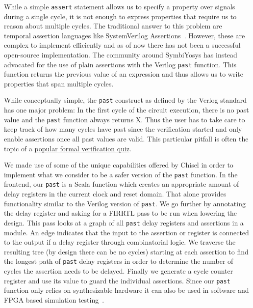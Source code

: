 \documentclass[conference]{IEEEtran}
\newcommand\scalainline[1]{\texttt{#1}}
\begin{document}
While a simple \scalainline{assert} statement allows us to specify a property over signals during a single
cycle, it is not enough to express properties that require us to reason about multiple cycles.
The traditional answer to this problem are temporal assertion languages like SystemVerilog Assertions~\cite{systemverilog}.
However, these are complex to implement efficiently and as of now there has not been a successful open-source implementation.
The community around SymbiYosys has instead advocated for the use of plain assertions with the Verilog \scalainline{past}
function. This function returns the previous value of an expression and thus allows us to write properties that span multiple cycles.

While conceptually simple, the \scalainline{past} construct as defined by the Verlog standard has one major problem:
In the first cycle of the circuit execution, there is no past value and the \scalainline{past} function always returns X.
Thus the user has to take care to keep track of how many cycles have past since the verification started and only enable assertions
once all past values are valid.
This particular pitfall is often the topic of a \href{http://zipcpu.com/quiz/2019/11/16/quiz07.html}{popular formal verification quiz}.

We made use of some of the unique capabilities offered by Chisel in order to implement what we consider to be a safer version of the
\scalainline{past} function.
In the frontend, our \scalainline{past} is a Scala function which creates an appropriate amount of delay registers in the current
clock and reset domain. That alone provides functionality similar to the Verilog version of \scalainline{past}.
We go further by annotating the delay register and asking for a FIRRTL pass to be run when lowering the design.
This pass looks at a graph of all \scalainline{past} delay registers and assertions in a module.
An edge indicates that the input to the assertion or register is connected to the output if a delay register through combinatorial logic.
We traverse the resulting tree (by design there can be no cycles) starting at each assertion
to find the longest path of \scalainline{past} delay registers in order to determine the number of cycles the assertion needs to be delayed.
Finally we generate a cycle counter register and use its value to guard the individual assertions.
Since our \scalainline{past} function only relies on synthesizable hardware it can also be used in software and FPGA based
simulation testing~\cite{karandikar2018firesim}.
\end{document}
